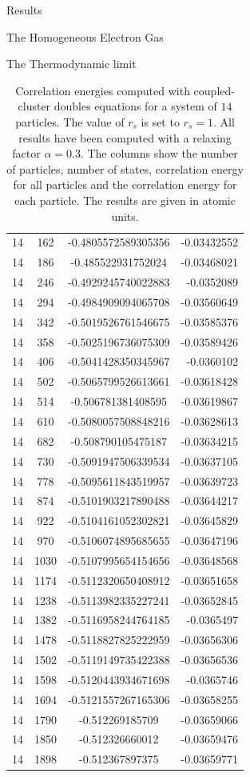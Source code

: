 \documentclass[twoside,english]{uiofysmaster}
\begin{document}
\begin{chapter}{Results}
\begin{section}{The Homogeneous Electron Gas}
\begin{subsection}{The Thermodynamic limit}
\begin{table}[H]
\begin{center}
\begin{tabular}[center]{l  c  c r}
						14 & 162 & -0.4805572589305356 & -0.03432552\\
						14 & 186 & -0.485522931752024  & -0.03468021\\
						14 & 246 & -0.4929245740022883 & -0.0352089\\
						14 & 294 & -0.4984909094065708 & -0.03560649\\
						14 & 342 & -0.5019526761546675 & -0.03585376\\
						14 & 358 & -0.5025196736075309 & -0.03589426\\
						14 & 406 & -0.5041428350345967 & -0.0360102\\
						14 & 502 & -0.5065799526613661 & -0.03618428\\
						14 & 514 & -0.506781381408595  & -0.03619867\\
						14 & 610 & -0.5080057508848216 & -0.03628613\\
						14 & 682 & -0.508790105475187  & -0.03634215\\
						14 & 730 & -0.5091947506339534 & -0.03637105\\
						14 & 778 & -0.5095611843519957 & -0.03639723\\
						14 & 874 & -0.5101903217890488 & -0.03644217\\
						14 & 922 & -0.5104161052302821 & -0.03645829\\
						14 & 970 & -0.5106074895685655 & -0.03647196\\
						14 & 1030& -0.5107995654154656 & -0.03648568\\
						14 & 1174& -0.5112320650408912 & -0.03651658\\
						14 & 1238& -0.5113982335227241 & -0.03652845\\
						14 & 1382& -0.5116958244764185 & -0.0365497\\
						14 & 1478& -0.5118827825222959 & -0.03656306\\
						14 & 1502& -0.5119149735422388 & -0.03656536\\
						14 & 1598& -0.5120443934671698 & -0.0365746\\
						14 & 1694& -0.5121557267165306 & -0.03658255\\
						14 & 1790& -0.512269185709 & -0.03659066\\
						14 & 1850& -0.512326660012 & -0.03659476\\
						14 & 1898& -0.512367897375 & -0.03659771\\
					\end{tabular}
				\end{center}
				\caption{Correlation energies computed with coupled-cluster doubles equations for a system of $14$ particles. The value of $r_s$ is set to $r_s=1$. All results have been computed with a relaxing factor $\alpha=0.3$. The columns show the number of particles, number of states, correlation energy for all particles and the correlation energy for each particle. The results are given in atomic units.}
				\label{table:ThermodynamicLimit1}
			\end{table}


\end{subsection}
\end{section}
\end{chapter}
\end{document}
